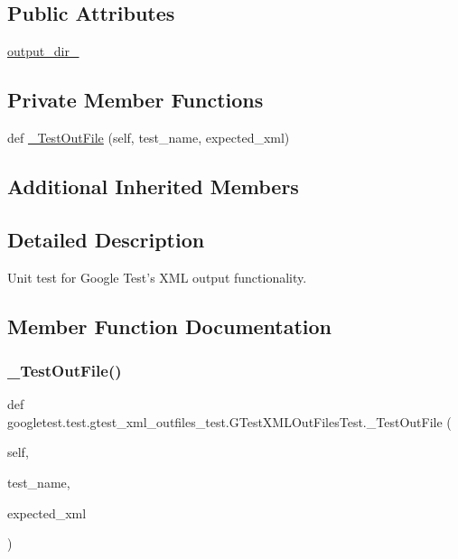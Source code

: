 \subsection*{Public Attributes}
\begin{DoxyCompactItemize}
\item 
\mbox{\hyperlink{classgoogletest_1_1test_1_1gtest__xml__outfiles__test_1_1_g_test_x_m_l_out_files_test_a0a622880c735dfd26f2450fd617a454a}{output\+\_\+dir\+\_\+}}
\end{DoxyCompactItemize}
\subsection*{Private Member Functions}
\begin{DoxyCompactItemize}
\item 
def \mbox{\hyperlink{classgoogletest_1_1test_1_1gtest__xml__outfiles__test_1_1_g_test_x_m_l_out_files_test_a41298b36c6ba24097a173c53630d5ebb}{\+\_\+\+Test\+Out\+File}} (self, test\+\_\+name, expected\+\_\+xml)
\end{DoxyCompactItemize}
\subsection*{Additional Inherited Members}


\subsection{Detailed Description}
\begin{DoxyVerb}Unit test for Google Test's XML output functionality.\end{DoxyVerb}
 

\subsection{Member Function Documentation}
\mbox{\label{classgoogletest_1_1test_1_1gtest__xml__outfiles__test_1_1_g_test_x_m_l_out_files_test_a41298b36c6ba24097a173c53630d5ebb}} 
\subsubsection{\texorpdfstring{\_TestOutFile()}{\_TestOutFile()}}
{\footnotesize\ttfamily def googletest.\+test.\+gtest\+\_\+xml\+\_\+outfiles\+\_\+test.\+G\+Test\+X\+M\+L\+Out\+Files\+Test.\+\_\+\+Test\+Out\+File (\begin{DoxyParamCaption}\item[{}]{self,  }\item[{}]{test\+\_\+name,  }\item[{}]{expected\+\_\+xml }\end{DoxyParamCaption})\hspace{0.3cm}{\ttfamily [private]}}

